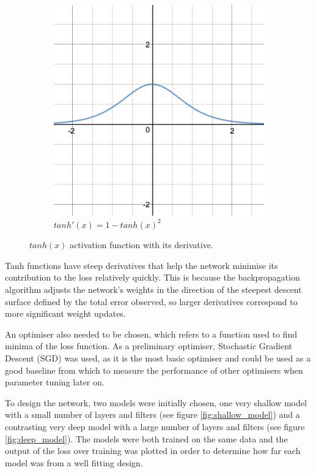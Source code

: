 \documentclass{l4proj}
\begin{document}
\begin{figure}[h]
\begin{subfigure}[b]{0.4\textwidth}
        \includegraphics[width=\textwidth]{images/tanh_prime.png}
        \caption{$tanh'(x) = 1 - tanh(x)^2$}
    \end{subfigure} 
    \caption{$tanh(x)$ activation function with its derivative.}
\end{figure}

Tanh functions have steep derivatives that help the network minimise its contribution to the loss relatively quickly. This is because the backpropagation algorithm adjusts the network's weights in the direction of the steepest descent surface defined by the total error observed, so larger derivatives correspond to more significant weight updates\cite{Activations}.

An optimiser also needed to be chosen, which refers to a function used to find minima of the loss function. As a preliminary optimiser, Stochastic Gradient Descent (SGD) was used, as it is the most basic optimiser and could be used as a good baseline from which to measure the performance of other optimisers when parameter tuning later on.

To design the network, two models were initially chosen, one very shallow model with a small number of layers and filters (see figure \ref{fig:shallow_model}) and a contrasting very deep model with a large number of layers and filters (see figure \ref{fig:deep_model}). The models were both trained on the same data and the output of the loss over training was plotted in order to determine how far each model was from a well fitting design. 
\end{document}
